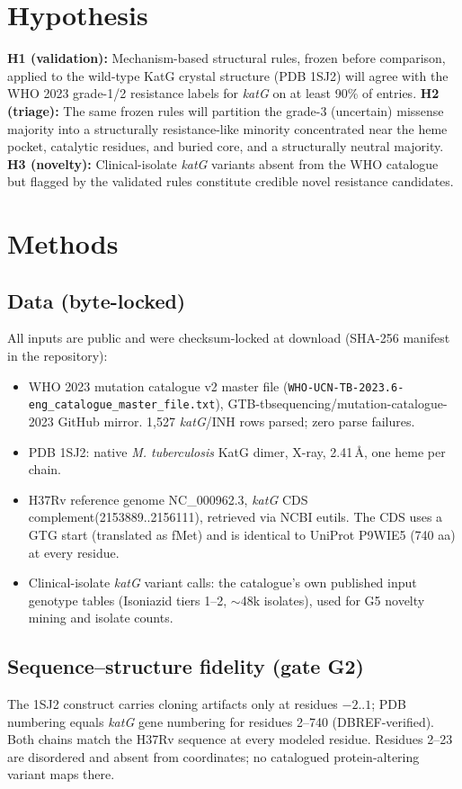 \documentclass[11pt]{article}
\begin{document}
\section{Hypothesis}
\textbf{H1 (validation):} Mechanism-based structural rules, frozen before comparison, applied to the wild-type KatG crystal structure (PDB 1SJ2) will agree with the WHO 2023 grade-1/2 resistance labels for \textit{katG} on at least 90\% of entries.
\textbf{H2 (triage):} The same frozen rules will partition the grade-3 (uncertain) missense majority into a structurally resistance-like minority concentrated near the heme pocket, catalytic residues, and buried core, and a structurally neutral majority.
\textbf{H3 (novelty):} Clinical-isolate \textit{katG} variants absent from the WHO catalogue but flagged by the validated rules constitute credible novel resistance candidates.

\section{Methods}
\subsection{Data (byte-locked)}
All inputs are public and were checksum-locked at download (SHA-256 manifest in the repository):
\begin{itemize}
\item WHO 2023 mutation catalogue v2 master file (\texttt{WHO-UCN-TB-2023.6-eng\_catalogue\_master\_file.txt}), GTB-tbsequencing/mutation-catalogue-2023 GitHub mirror. 1,527 \textit{katG}/INH rows parsed; zero parse failures.
\item PDB 1SJ2: native \textit{M. tuberculosis} KatG dimer, X-ray, 2.41\,\AA, one heme per chain.
\item H37Rv reference genome NC\_000962.3, \textit{katG} CDS complement(2153889..2156111), retrieved via NCBI eutils. The CDS uses a GTG start (translated as fMet) and is identical to UniProt P9WIE5 (740 aa) at every residue.
\item Clinical-isolate \textit{katG} variant calls: the catalogue's own published input genotype tables (Isoniazid tiers 1--2, $\sim$48k isolates), used for G5 novelty mining and isolate counts.
\end{itemize}

\subsection{Sequence--structure fidelity (gate G2)}
The 1SJ2 construct carries cloning artifacts only at residues $-2$..$1$; PDB numbering equals \textit{katG} gene numbering for residues 2--740 (DBREF-verified). Both chains match the H37Rv sequence at every modeled residue. Residues 2--23 are disordered and absent from coordinates; no catalogued protein-altering variant maps there.
\end{document}
